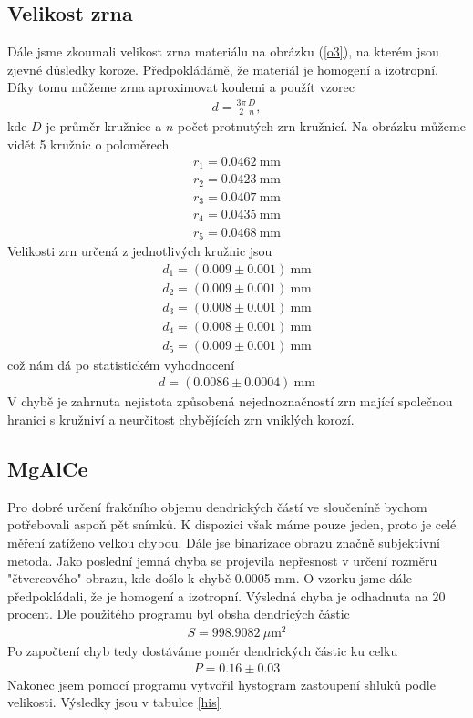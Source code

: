 \documentclass[a4paper,12pt]{article}
\begin{document}
\subsection{Velikost zrna}
Dále jsme zkoumali velikost zrna materiálu na obrázku (\ref{o3}), na kterém jsou zjevné důsledky koroze. Předpokládámě, že materiál je homogení a izotropní. Díky 
tomu můžeme zrna aproximovat koulemi a použít vzorec 
\begin{eqnarray}
d=\frac{3\pi}{2}\frac{D}{n},
\end{eqnarray}
kde $D$ je průměr kružnice a $n$ počet protnutých zrn kružnicí. Na obrázku můžeme vidět 5 kružnic o poloměrech
\begin{eqnarray}
r_1=0.0462\ \mbox{mm} \\
r_2=0.0423\ \mbox{mm} \\
r_3=0.0407\ \mbox{mm} \\
r_4=0.0435\ \mbox{mm} \\
r_5=0.0468\ \mbox{mm}
\end{eqnarray}
Velikosti zrn určená z jednotlivých kružnic jsou
\begin{eqnarray}
d_1=(0.009 \pm 0.001)\ \mbox{mm} \\
d_2=(0.009 \pm 0.001)\  \mbox{mm} \\
d_3=(0.008 \pm 0.001)\  \mbox{mm} \\
d_4=(0.008 \pm 0.001)\ \mbox{mm} \\
d_5=(0.009 \pm 0.001)\  \mbox{mm} 
\end{eqnarray}
což nám dá po statistickém vyhodnocení
\begin{eqnarray}
d=(0.0086 \pm 0.0004)\ \mbox{mm}
\end{eqnarray}
V chybě je zahrnuta nejistota způsobená nejednoznačností  zrn mající společnou hranici s kružniví a neurčitost chybějících zrn vniklých korozí.

\subsection{MgAlCe}
Pro dobré určení frakčního objemu dendrických částí ve sloučeníně bychom potřebovali aspoň pět snímků. K dispozici však máme pouze jeden, proto je celé měření zatíženo velkou chybou. Dále jse binarizace obrazu značně subjektivní 
metoda. Jako poslední jemná chyba se projevila nepřesnost v určení rozměru "čtvercového" obrazu, kde došlo k chybě 0.0005 mm. O vzorku jsme dále předpokládali, že je homogení a izotropní. Výsledná chyba je odhadnuta na 20 procent. Dle použitého programu byl obsha dendricých částic 
\begin{eqnarray}
S=998.9082\ \mu\mbox{m}^2
\end{eqnarray}
Po započtení chyb tedy dostáváme poměr dendrických částic ku celku
\begin{eqnarray}
P=0.16\pm0.03
\end{eqnarray}
Nakonec jsem pomocí programu vytvořil hystogram zastoupení shluků podle velikosti. Výsledky jsou v tabulce \ref{his}
\end{document}
